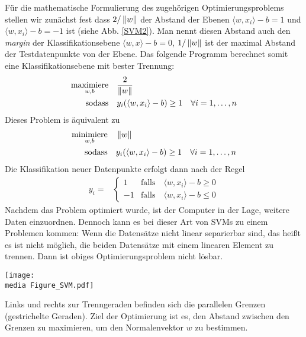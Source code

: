 Für die mathematische Formulierung des zugehörigen Optimierungsproblems stellen wir zunächst fest dass $2/\left\lVert w\right\rVert$ der Abstand der Ebenen $\langle w, x_i\rangle - b = 1$ und $\langle w, x_i\rangle - b = -1$ ist (siehe Abb. \ref{SVM2}). Man nennt diesen Abstand auch den \emph{margin} der Klassifikationsebene $\langle w, x\rangle - b = 0$, $1/\left\lVert w\right\rVert$ ist der maximal Abstand der Testdatenpunkte von der Ebene. Das folgende Programm berechnet somit eine Klassifikationsebene mit bester Trennung:
\begin{align*}
	\underset{w,b}{\operatorname{maximiere}} \quad & \frac{2}{\left\lVert w\right\rVert} \\
	\operatorname{sodass} \quad &y_{i}(\langle w,x_{i} \rangle -b) \geq 1 \quad \forall  i = 1,\dots ,n
\end{align*}
Dieses Problem is äquivalent zu
\begin{align*}
		\underset{w,b}{\operatorname{minimiere}} \quad & \left\lVert w\right\rVert \\
		\operatorname{sodass} \quad &y_{i}(\langle w,x_{i} \rangle -b) \geq 1 \quad \forall i = 1,\dots,n
\end{align*}
Die Klassifikation neuer Datenpunkte erfolgt dann nach der Regel
\begin{align*}
	y_{i} =& 
        \begin{cases}
1 &\text{falls} \quad \langle w,x_{i} \rangle - b \geq 0 \\
-1 &\text{falls} \quad \langle w,x_{i} \rangle - b \leq 0
\end{cases}
\end{align*}
Nachdem das Problem optimiert wurde, ist der Computer in der Lage, weitere Daten einzuordnen.
Dennoch kann es bei dieser Art von SVMs zu einem Problemen kommen: Wenn die Datensätze nicht linear separierbar sind, das heißt es ist nicht möglich, die beiden Datensätze mit einem linearen Element zu trennen. Dann ist obiges Optimierungsproblem nicht lösbar.

\begin{dsafigure}
	\begin{center}
		\texttt{[image: \\media Figure\_SVM.pdf]}
		\caption{Links und rechts zur Trenngeraden befinden sich die parallelen Grenzen (gestrichelte Geraden). Ziel der Optimierung ist es, den Abstand zwischen den Grenzen zu maximieren, um den Normalenvektor $w$ zu bestimmen.}
		\label{SVM2}
	\end{center}
\end{dsafigure}

